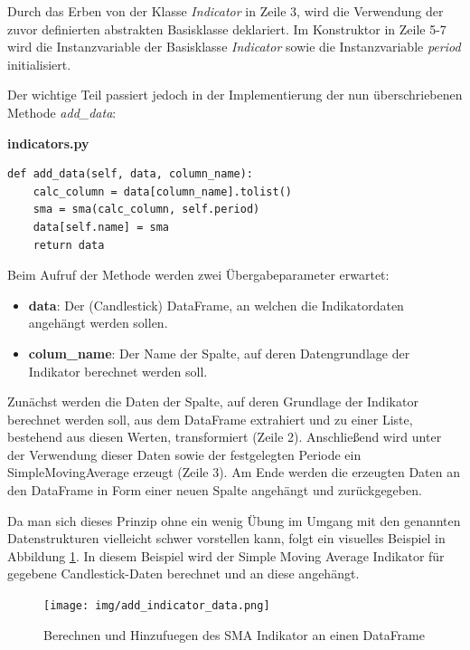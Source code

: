 \documentclass[oneside]{ausarbeitung}
\begin{document}
Durch das Erben von der Klasse \textit{Indicator} in Zeile 3, wird die Verwendung der zuvor definierten abstrakten Basisklasse deklariert. Im Konstruktor in Zeile 5-7 wird die Instanzvariable der Basisklasse \textit{Indicator} sowie die Instanzvariable \textit{period} initialisiert.

Der wichtige Teil passiert jedoch in der Implementierung der nun überschriebenen Methode \textit{add\_data}:

\lstset{language=Python}
\lstset{frame=lines}
\lstset{basicstyle=\footnotesize}
\textbf{indicators.py}
\begin{lstlisting}
def add_data(self, data, column_name):
	calc_column = data[column_name].tolist()
	sma = sma(calc_column, self.period)
	data[self.name] = sma
	return data
\end{lstlisting}

Beim Aufruf der Methode werden zwei Übergabeparameter erwartet:
\begin{itemize}
	\item \textbf{data}: Der (Candlestick) DataFrame, an welchen die
		Indikatordaten angehängt werden sollen.
	\item \textbf{colum\_name}: Der Name der Spalte, auf deren Datengrundlage der
		Indikator berechnet werden soll.
\end{itemize}

Zunächst werden die Daten der Spalte, auf deren Grundlage der Indikator berechnet werden soll, aus dem DataFrame extrahiert und zu einer Liste, bestehend aus diesen Werten, transformiert (Zeile 2). Anschließend wird unter der Verwendung dieser Daten sowie der festgelegten Periode ein SimpleMovingAverage erzeugt (Zeile 3). Am Ende werden die erzeugten Daten an den DataFrame in Form einer neuen Spalte angehängt und zurückgegeben.

Da man sich dieses Prinzip ohne ein wenig Übung im Umgang mit den genannten Datenstrukturen vielleicht schwer vorstellen kann, folgt ein visuelles Beispiel in Abbildung \ref{fig:17}. In diesem Beispiel wird der Simple Moving Average Indikator für gegebene Candlestick-Daten berechnet und an diese angehängt.

\begin{figure}[H]
  \centering
  \texttt{[image: img/add\_indicator\_data.png]}
  \caption{Berechnen und Hinzufuegen des SMA Indikator an einen DataFrame}
  \label{fig:17}
\end{figure}
\end{document}
